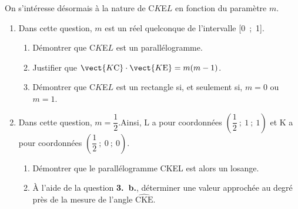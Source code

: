 On s'intéresse désormais à la nature de C$K$E$L$ en fonction du paramètre $m$.

\begin{enumerate}[resume]
\item Dans cette question, $m$ est un réel quelconque de l'intervalle [0~;~1].
	\begin{enumerate}
		\item Démontrer que C$K$E$L$ est un parallélogramme.
		\item Justifier que $\vect{K\text{C}} \cdot \vect{K\text{E}} = m(m - 1)$.
		\item Démontrer que C$K$E$L$ est un rectangle si, et seulement si, $m = 0$ ou $m = 1$.
	\end{enumerate}
\item Dans cette question, $m = \dfrac12$.Ainsi, L a pour coordonnées 
$\left(\dfrac12~;~1~;~1\right)$ et K a pour coordonnées $\left(\dfrac12~;~0~;~0\right)$.
	\begin{enumerate}
		\item Démontrer que le parallélogramme CKEL est alors un losange.
		\item À l'aide de la question \textbf{3.~b.}, déterminer une valeur approchée au degré près de la mesure de l'angle $\widehat{\text{CKE}}$.
	\end{enumerate}
\end{enumerate}
